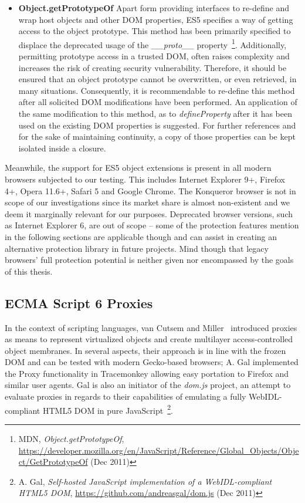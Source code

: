 \begin{itemize}
	\item \textbf{Object.getPrototypeOf} Apart form providing interfaces to re-define and wrap host objects and other DOM properties, ES5 specifies a way of getting access to the object prototype. This method has been primarily specified to displace the deprecated usage of the \textit{\_\_proto\_\_} property~\footnote{MDN, \textit{Object.getPrototypeOf}, \url{https://developer.mozilla.org/en/JavaScript/Reference/Global_Objects/Object/GetPrototypeOf} (Dec 2011)}. Additionally, permitting prototype access in a trusted DOM, often raises complexity and increases the risk of creating security vulnerability. Therefore, it should be ensured that an object prototype cannot be overwritten, or even retrieved, in many situations. Consequently, it is recommendable to re-define this method after all solicited DOM modifications have been performed. An application of the same modification to this method, as to \textit{defineProperty} after it has been used on the existing DOM properties is suggested. For further references and for the sake of maintaining continuity, a copy of those properties can be kept isolated inside a closure. 
      \end{itemize}

      Meanwhile, the support for ES5 object extensions is present in all modern browsers subjected to our testing. This includes Internet Explorer 9+, Firefox 4+, Opera 11.6+, Safari 5 and Google Chrome. The Konqueror browser is not in scope of our investigations since its market share is almost non-existent and we deem it marginally relevant for our purposes. Deprecated browser versions, such as Internet Explorer 6, are out of scope -- some of the protection features mention in the following sections are applicable though and can assist in creating an alternative protection library in future projects. Mind though that legacy browsers' full protection potential is neither given nor encompassed by the goals of this thesis.

    \subsection{ECMA Script 6 Proxies}
    \label{subsubsec:6.3.3.es5_proxies}

      In the context of scripting languages, van Cutsem and Miller~\cite{van2010proxies} introduced proxies as means to represent virtualized objects and create multilayer access-controlled object membranes. In several aspects, their approach is in line with the frozen DOM and can be tested with modern Gecko-based browsers; A. Gal implemented the Proxy functionality in Tracemonkey allowing easy portation to Firefox and similar user agents. Gal is also an initiator of the \textit{dom.js} project, an attempt to evaluate proxies in regards to their capabilities of emulating a fully WebIDL-compliant HTML5 DOM in pure JavaScript~\footnote{A. Gal, \textit{Self-hosted JavaScript implementation of a WebIDL-compliant HTML5 DOM}, \url{https://github.com/andreasgal/dom.js} (Dec 2011)}.

